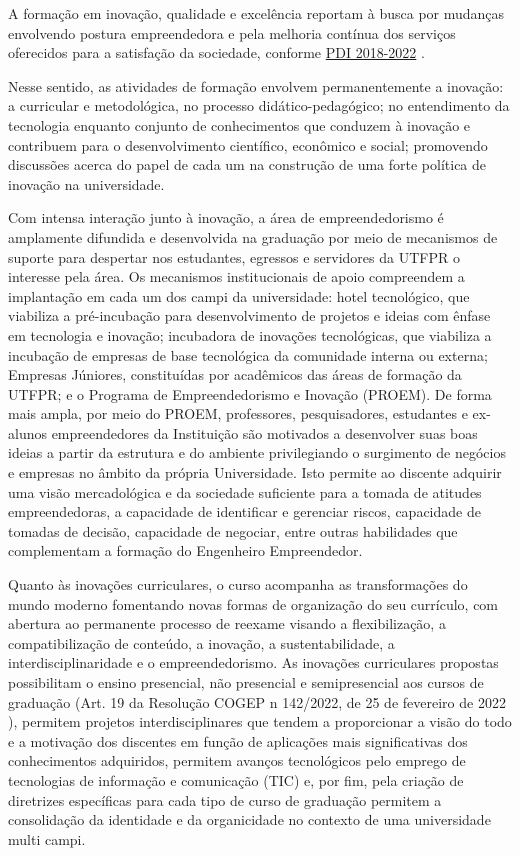 A formação em inovação, qualidade e excelência reportam à busca por mudanças envolvendo postura empreendedora e pela melhoria contínua dos serviços oferecidos para a satisfação da sociedade, conforme \href{https://cloud.utfpr.edu.br/index.php/s/15P0OcMLMdt9Rv7}{PDI 2018-2022} \cite{pdiutfpr}.

Nesse sentido, as atividades de formação envolvem permanentemente a inovação: a curricular e metodológica, no processo didático-pedagógico; no entendimento da tecnologia enquanto conjunto de conhecimentos que conduzem à inovação e contribuem para o desenvolvimento científico, econômico e social; promovendo discussões acerca do papel de cada um na construção de uma forte política de inovação na universidade.

Com intensa interação junto à inovação, a área de empreendedorismo é amplamente difundida e desenvolvida na graduação por meio de mecanismos de suporte para despertar nos estudantes, egressos e servidores da UTFPR o interesse pela área. Os mecanismos institucionais de apoio compreendem a implantação em cada um dos campi da universidade: hotel tecnológico, que viabiliza a pré-incubação para desenvolvimento de projetos e ideias com ênfase em tecnologia e inovação; incubadora de inovações tecnológicas, que viabiliza a incubação de empresas de base tecnológica da comunidade interna ou externa; Empresas Júniores, constituídas por acadêmicos das áreas de formação da UTFPR; e o Programa de Empreendedorismo e Inovação (PROEM).  De forma mais ampla, por meio do PROEM, professores, pesquisadores, estudantes e ex-alunos empreendedores da Instituição são motivados a desenvolver suas boas ideias a partir da estrutura e do ambiente privilegiando o surgimento de negócios e empresas no âmbito da própria Universidade.  Isto permite ao discente adquirir uma visão mercadológica e da sociedade suficiente para a tomada de atitudes empreendedoras, a capacidade de identificar e gerenciar riscos, capacidade de tomadas de decisão, capacidade de negociar, entre outras habilidades que complementam a formação do Engenheiro Empreendedor.


Quanto às inovações curriculares, o curso acompanha as transformações do mundo moderno fomentando novas formas de organização do seu currículo, com abertura ao permanente processo de reexame visando a flexibilização, a compatibilização de conteúdo, a inovação, a sustentabilidade, a interdisciplinaridade e o empreendedorismo.  As inovações curriculares propostas possibilitam o ensino presencial, não presencial e semipresencial aos cursos de graduação (Art. 19 da Resolução COGEP n\textordmasculine{} 142/2022, de 25 de fevereiro de 2022 \cite{cogep142}), permitem projetos interdisciplinares que tendem a proporcionar a visão do todo e a motivação dos discentes em função de aplicações mais significativas dos conhecimentos adquiridos, permitem avanços tecnológicos pelo emprego de tecnologias de informação e comunicação (TIC) e, por fim, pela criação de diretrizes específicas para cada tipo de curso de graduação permitem a consolidação da identidade e da organicidade no contexto de uma universidade multi campi.

